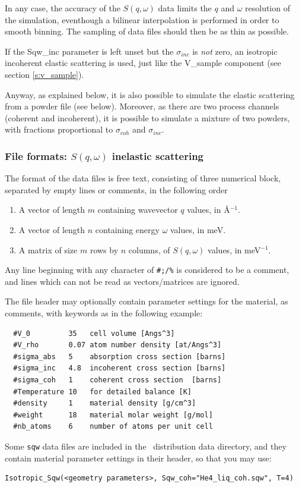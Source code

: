 In any case, the accuracy of the $S(q, \omega)$ data limits the $q$ and $\omega$ resolution of the simulation, eventhough a bilinear interpolation is performed in order to smooth binning. The sampling of data files should then be as thin as possible.

If the Sqw\_inc parameter is left unset but the $\sigma_{inc}$ is \emph{not} zero, an isotropic incoherent elastic scattering is used, just like the V\_sample component (see section \ref{s:v_sample}).

Anyway, as explained below, it is also possible to simulate the elastic scattering from a powder file (see below). Moreover, as there are two process channels (coherent and incoherent), it is possible to simulate a mixture of two powders, with fractions proportional to $\sigma_{coh}$ and $\sigma_{inc}$.

\subsubsection{File formats: $S(q,\omega)$ inelastic scattering}

The format of the data files is free text, consisting of three numerical block, separated by empty lines or comments, in the following order
\begin{enumerate}
\item A vector of length $m$ containing wavevector $q$ values, in \AA$^{-1}$.
\item A vector of length $n$ containing energy $\omega$ values, in meV.
\item A matrix of size $m$ rows by $n$ columns, of $S(q, \omega)$ values, in meV$^{-1}$.
\end{enumerate}
Any line beginning with any character of \verb+#;/%+ is considered to be a comment, and lines which can not be read as vectors/matrices are ignored.

The file header may optionally contain parameter settings for the material, as comments, with keywords as in the following example:
\begin{verbatim}
  #V_0         35   cell volume [Angs^3]
  #V_rho       0.07 atom number density [at/Angs^3]
  #sigma_abs   5    absorption cross section [barns]
  #sigma_inc   4.8  incoherent cross section [barns]
  #sigma_coh   1    coherent cross section  [barns]
  #Temperature 10   for detailed balance [K]
  #density     1    material density [g/cm^3]
  #weight      18   material molar weight [g/mol]
  #nb_atoms    6    number of atoms per unit cell
\end{verbatim}
Some \verb+sqw+ data files are included in the \MCS\ distribution data directory, and they contain material parameter settings in their header, so that you may use:
\begin{verbatim}
Isotropic_Sqw(<geometry parameters>, Sqw_coh="He4_liq_coh.sqw", T=4)
\end{verbatim}

